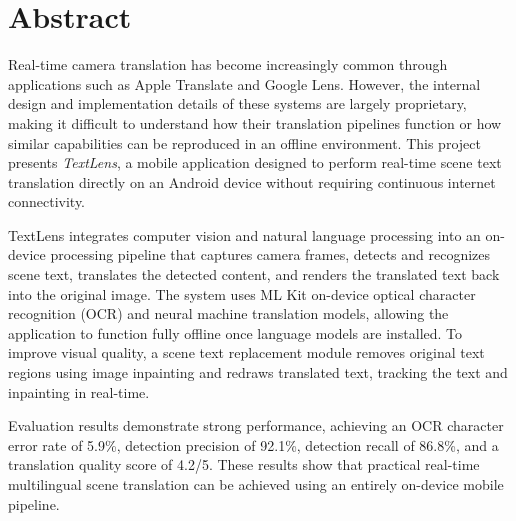 \chapter*{Abstract}

Real-time camera translation has become increasingly common through applications such as Apple Translate and Google Lens. However, the internal design and implementation details of these systems are largely proprietary, making it difficult to understand how their translation pipelines function or how similar capabilities can be reproduced in an offline environment. This project presents \textit{TextLens}, a mobile application designed to perform real-time scene text translation directly on an Android device without requiring continuous internet connectivity.

TextLens integrates computer vision and natural language processing into an on-device processing pipeline that captures camera frames, detects and recognizes scene text, translates the detected content, and renders the translated text back into the original image. The system uses ML Kit on-device optical character recognition (OCR) and neural machine translation models, allowing the application to function fully offline once language models are installed. To improve visual quality, a scene text replacement module removes original text regions using image inpainting and redraws translated text, tracking the text and inpainting in real-time.

Evaluation results demonstrate strong performance, achieving an OCR character error rate of 5.9\%, detection precision of 92.1\%, detection recall of 86.8\%, and a translation quality score of 4.2/5. These results show that practical real-time multilingual scene translation can be achieved using an entirely on-device mobile pipeline.
